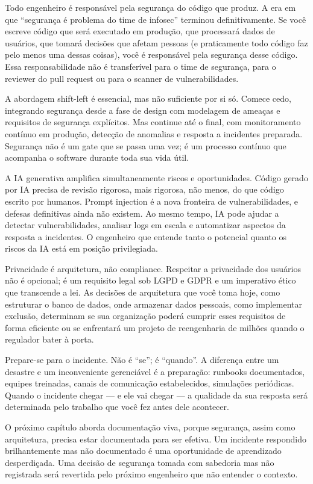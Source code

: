 Todo engenheiro é responsável pela segurança do código que produz. A era em que
``segurança é problema do time de infosec'' terminou definitivamente. Se você
escreve código que será executado em produção, que processará dados de usuários,
que tomará decisões que afetam pessoas (e praticamente todo código faz pelo
menos uma dessas coisas), você é responsável pela segurança desse código.
Essa responsabilidade não é transferível para o time de segurança, para o
reviewer do pull request ou para o scanner de vulnerabilidades.

A abordagem shift-left é essencial, mas não suficiente por si só. Comece cedo,
integrando segurança desde a fase de design com modelagem de ameaças e requisitos
de segurança explícitos. Mas continue até o final, com monitoramento contínuo em
produção, detecção de anomalias e resposta a incidentes preparada. Segurança não
é um gate que se passa uma vez; é um processo contínuo que acompanha o software
durante toda sua vida útil.

A IA generativa amplifica simultaneamente riscos e oportunidades. Código gerado
por IA precisa de revisão rigorosa, mais rigorosa, não menos, do que código
escrito por humanos. Prompt injection é a nova fronteira de vulnerabilidades, e
defesas definitivas ainda não existem. Ao mesmo tempo, IA pode ajudar a detectar
vulnerabilidades, analisar logs em escala e automatizar aspectos da resposta a
incidentes. O engenheiro que entende tanto o potencial quanto os riscos da IA
está em posição privilegiada.

Privacidade é arquitetura, não compliance. Respeitar a privacidade dos usuários
não é opcional; é um requisito legal sob LGPD e GDPR e um imperativo ético que
transcende a lei. As decisões de arquitetura que você toma hoje, como
estruturar o banco de dados, onde armazenar dados pessoais, como implementar
exclusão, determinam se sua organização poderá cumprir esses requisitos de
forma eficiente ou se enfrentará um projeto de reengenharia de milhões quando
o regulador bater à porta.

Prepare-se para o incidente. Não é ``se''; é ``quando''. A diferença entre
um desastre e um inconveniente gerenciável é a preparação: runbooks
documentados, equipes treinadas, canais de comunicação estabelecidos, simulações
periódicas. Quando o incidente chegar --- e ele vai chegar --- a qualidade da
sua resposta será determinada pelo trabalho que você fez antes dele acontecer.

O próximo capítulo aborda documentação viva, porque segurança, assim como
arquitetura, precisa estar documentada para ser efetiva. Um incidente respondido
brilhantemente mas não documentado é uma oportunidade de aprendizado
desperdiçada. Uma decisão de segurança tomada com sabedoria mas não registrada
será revertida pelo próximo engenheiro que não entender o contexto.

